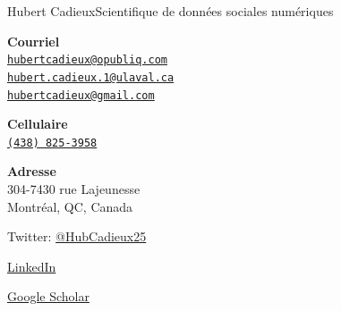 \documentclass{article}
\begin{document}
\begin{cv}[avatar]{Hubert Cadieux}{Scientifique de données sociales numériques}
\begin{cvitem}[Envelope][4]
    \textbf{Courriel}\\
    \href{mailto:hubertcadieux@opubliq.com}{\texttt{hubertcadieux@opubliq.com}}\\
    \href{mailto:hubert.cadieux.1@ulaval.ca}{\texttt{hubert.cadieux.1@ulaval.ca}}\\
    \href{mailto:hubertcadieux@gmail.com}{\texttt{hubertcadieux@gmail.com}}
\end{cvitem}

\cvseparator[3]
\begin{cvitem}[Phone][4]
    \textbf{Cellulaire}\\
    \href{tel:+4388253958}{\texttt{(438) 825-3958}}
\end{cvitem}

\cvseparator[3]
\begin{cvitem}[Home][4]
    \textbf{Adresse}\\
    304-7430 rue Lajeunesse\\ Montréal, QC, Canada
\end{cvitem}

\cvseparator[2]
\begin{cvitem}
    Twitter: \href{https://twitter.com/HubCadieux25}{@HubCadieux25}
\end{cvitem}

\begin{cvitem}
    \href{https://www.linkedin.com/in/hubert-cadieux-7172571a0/}{LinkedIn}
\end{cvitem}

\begin{cvitem}
\href{https://scholar.google.com/citations?user=VF6HfPoAAAAJ&hl=fr}{Google Scholar}
\end{cvitem}









\end{cv}
\end{document}
